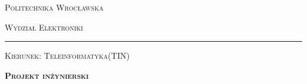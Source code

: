 \titlepage
\addtolength{\textheight}{1.8cm}
\addtolength{\textwidth}{0.2cm}
\addtolength{\topmargin}{-2.2cm}
\enlargethispage{3cm}
\begin{center}
	\begin{Huge}
		\textsc{Politechnika Wrocławska}
	\end{Huge}

	\begin{huge}
		\vspace{1ex}
		\textsc{Wydział Elektroniki}
	\end{huge}
	\rule[-0.3ex]{\textwidth}{1pt}
	
	\begin{flushleft}
		\begin{large}
			\vspace{0.4cm}
			\textsc{Kierunek: Teleinformatyka(TIN)} \newline
		\end{large}
	\end{flushleft}

	\begin{center}
		\begin{Huge}
			\vspace{1.7ex}
			\textsc{\textbf{Projekt inżynierski}} 

		\end{Huge}
	\end{center}
	\vspace{1cm}
		
	\begin{flushright}
		\begin{minipage}[t][4cm][t]{11cm}
			\begin{center}
				\begin{large}
					\tematen
				\end{large}
			\end{center}
			\vspace{0.3cm}
			\begin{center}
				\begin{large}
					\temat
				\end{large}
			\end{center}
		\end{minipage}
	\end{flushright}
				

\end{center}
